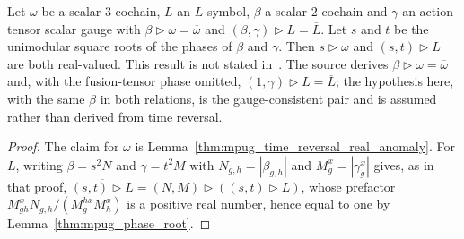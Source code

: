 \begin{lemma}
    \label{thm:mpug_time_reversal_real_l_symbols}
    \leanok
    Let $\omega$ be a scalar $3$-cochain, $L$ an $L$-symbol, $\beta$ a
    scalar $2$-cochain and $\gamma$ an action-tensor scalar gauge with
    $\beta\mathbin{\triangleright}\omega=\overline\omega$ and
    $(\beta,\gamma)\mathbin{\triangleright}L=\overline L$. Let $s$ and $t$ be
    the unimodular square roots of the phases of $\beta$ and $\gamma$. Then
    $s\mathbin{\triangleright}\omega$ and
    $(s,t)\mathbin{\triangleright}L$ are both real-valued. This result is not stated
    in~\cite[Section~4.3]{GarreRubio2023MPOSym}.
    The source derives $\beta\mathbin{\triangleright}\omega=\overline\omega$
    and, with the fusion-tensor phase omitted,
    $(1,\gamma)\mathbin{\triangleright}L=\overline L$; the hypothesis here,
    with the same $\beta$ in both relations, is the gauge-consistent pair
    and is assumed rather than derived from time reversal.
\end{lemma}

\begin{proof}\leanok
    The claim for $\omega$ is Lemma~\ref{thm:mpug_time_reversal_real_anomaly}.
    For $L$, writing $\beta=s^2N$ and $\gamma=t^2M$ with
    $N_{g,h}=|\beta_{g,h}|$ and $M^x_g=|\gamma^x_g|$ gives, as in that proof,
    $\overline{(s,t)\mathbin{\triangleright}L}
        =(N,M)\mathbin{\triangleright}((s,t)\mathbin{\triangleright}L)$, whose
    prefactor
    $M^x_{gh}N_{g,h}/(M^{h x}_gM^x_h)$ is a positive real number, hence
    equal to one by Lemma~\ref{thm:mpug_phase_root}.
\end{proof}

